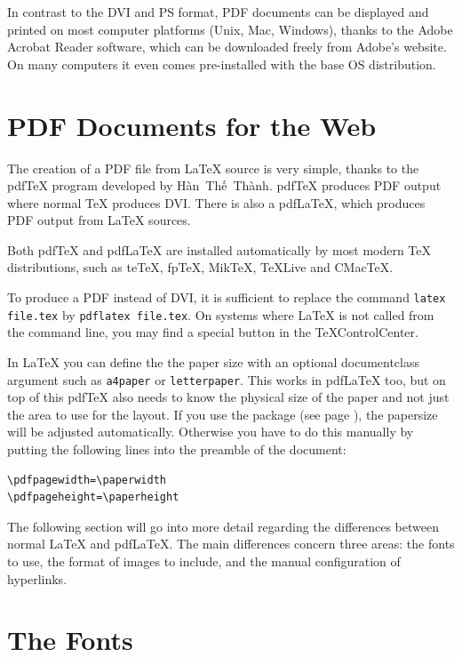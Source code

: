 \documentclass[twoside,11pt,letterpaper]{article}
\begin{document}
In contrast to the DVI and PS format, PDF documents can be displayed
and printed on most computer platforms (Unix, Mac, Windows), thanks to
the Adobe Acrobat Reader software, which can be downloaded freely from
Adobe's website. On many computers it even comes pre-installed with the base
OS distribution.

\section{PDF Documents for the Web}

The creation of a PDF file from \LaTeX{} source is very simple,
thanks to the pdf\TeX{} program developed by
H\`an~Th\'{\^e}~Th\`anh. pdf\TeX{} produces PDF output where normal
\TeX{} produces DVI. There is also a pdf\LaTeX{}, which produces
  PDF output from \LaTeX{} sources. 

Both pdf\TeX{} and pdf\LaTeX{} are installed automatically by most
modern \TeX{} distributions, such as te\TeX{}, fp\TeX{},
Mik\TeX, \TeX{}Live and CMac\TeX{}.

To produce a PDF instead of DVI, it is sufficient to replace the
command \texttt{latex file.tex} by
\texttt{pdflatex file.tex}. On systems where \LaTeX{} is not called from the
command line, you may find a special button in the \TeX{}ControlCenter.

In \LaTeX{} you can define the the paper size with an 
optional documentclass argument such as \texttt{a4paper} or
\texttt{letterpaper}. This works in pdf\LaTeX{} too, but on top of this
pdf\TeX{} also needs to know the physical size of the paper and not just
the area to use for the layout.
If you use the
 package (see page \pageref{ssec:pdfhyperref}), the
papersize will be adjusted automatically. Otherwise you have to do this
manually by putting the following lines into the preamble of the document:
\begin{code}
\begin{verbatim}
\pdfpagewidth=\paperwidth
\pdfpageheight=\paperheight
\end{verbatim}
\end{code}

The following section will go into more detail regarding the differences
between normal \LaTeX{} and pdf\LaTeX{}. The main differences concern
three areas: the fonts to use, the format of images to include, and the
manual configuration of hyperlinks.

\section{The Fonts}
\end{document}
